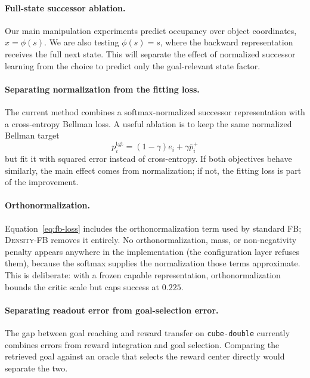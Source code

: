 \documentclass{article}
\newcommand{\DensityFB}{\textsc{Density-FB}}
\begin{document}
\paragraph{Full-state successor ablation.}
Our main manipulation experiments predict occupancy over object coordinates, $x=\phi(s)$.
We are also testing $\phi(s)=s$, where the backward representation receives the full next state.
This will separate the effect of normalized successor learning from the choice to predict only the goal-relevant state factor.

\paragraph{Separating normalization from the fitting loss.}
The current method combines a softmax-normalized successor representation with a cross-entropy Bellman loss.
A useful ablation is to keep the same normalized Bellman target
\begin{equation}
p_i^{\mathrm{tgt}}
=
(1-\gamma)e_i+\gamma\bar p_i^+
\end{equation}
but fit it with squared error instead of cross-entropy.
If both objectives behave similarly, the main effect comes from normalization; if not, the fitting loss is part of the improvement.

\paragraph{Orthonormalization.}
Equation~\ref{eq:fb-loss} includes the orthonormalization term used by standard FB; \DensityFB{} removes it entirely.
No orthonormalization, mass, or non-negativity penalty appears anywhere in the implementation (the configuration layer refuses them), because the softmax supplies the normalization those terms approximate.
This is deliberate: with a frozen capable representation, orthonormalization bounds the critic scale but caps success at $0.225$.

\paragraph{Separating readout error from goal-selection error.}
The gap between goal reaching and reward transfer on \texttt{cube-double} currently combines errors from reward integration and goal selection.
Comparing the retrieved goal against an oracle that selects the reward center directly would separate the two.



\end{document}
